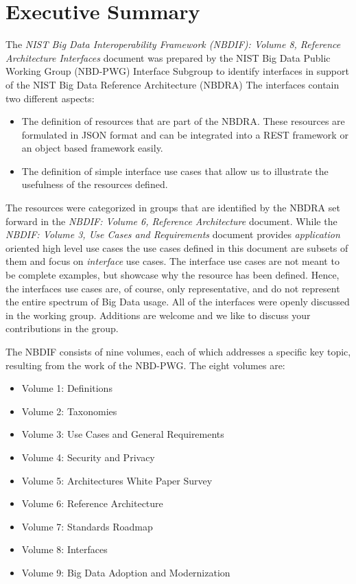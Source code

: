 \section*{Executive Summary}

The {\it NIST Big Data Interoperability Framework (NBDIF): Volume 8, Reference Architecture Interfaces} document
\cite{nist-vol-8} was prepared by the NIST Big Data Public Working
Group (NBD-PWG) Interface Subgroup to identify interfaces in support
of the NIST Big Data Reference Architecture (NBDRA) The interfaces
contain two different aspects:

\begin{itemize}

\item The definition of resources that are part of the NBDRA. These
  resources are formulated in JSON format and can be integrated into a
  REST framework or an object based framework easily.

\item The definition of simple interface use cases that allow us to
  illustrate the usefulness of the resources defined.

\end{itemize} 

The resources were categorized in groups that are identified by the
NBDRA set forward in the {\it NBDIF: Volume 6, Reference Architecture} document. While 
the {\it NBDIF: Volume 3, Use Cases and Requirements} document provides {\it
  application} oriented high level use cases the use cases defined in
this document are subsets of them and focus on {\it interface} use
cases. The interface use cases are not meant to be complete examples,
but showcase why the resource has been defined. Hence, the interfaces
use cases are, of course, only representative, and do not represent
the entire spectrum of Big Data usage. All of the interfaces were
openly discussed in the working group. Additions are welcome and we
like to discuss your contributions in the group.

The NBDIF consists of nine
volumes, each of which addresses a specific key topic, resulting from
the work of the NBD-PWG. The eight volumes are:

\begin{itemize}
\item Volume 1: Definitions
\item Volume 2: Taxonomies
\item Volume 3: Use Cases and General Requirements
\item Volume 4: Security and Privacy
\item Volume 5: Architectures White Paper Survey
\item Volume 6: Reference Architecture
\item Volume 7: Standards Roadmap
\item Volume 8: Interfaces
\item Volume 9: Big Data Adoption and Modernization
\end{itemize}


